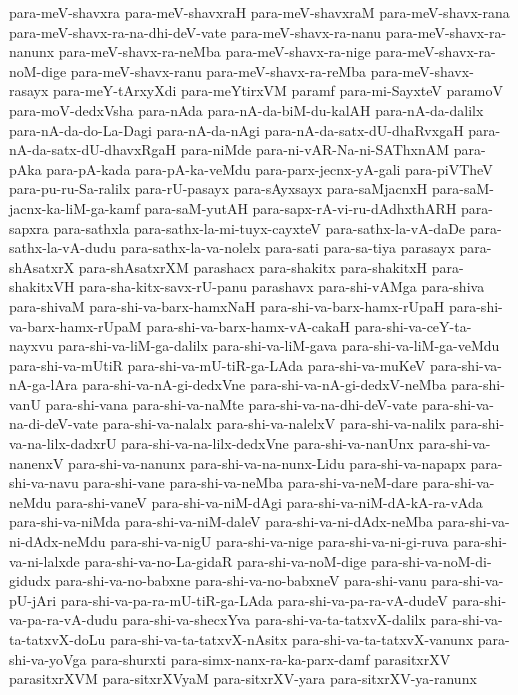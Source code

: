 {para-meV-shavxra
para-meV-shavxraH
para-meV-shavxraM
para-meV-shavx-rana
para-meV-shavx-ra-na-dhi-deV-vate
para-meV-shavx-ra-nanu
para-meV-shavx-ra-nanunx
para-meV-shavx-ra-neMba
para-meV-shavx-ra-nige
para-meV-shavx-ra-noM-dige
para-meV-shavx-ranu
para-meV-shavx-ra-reMba
para-meV-shavx-rasayx
para-meY-tArxyXdi
para-meYtirxVM
paramf
para-mi-SayxteV
paramoV
para-moV-dedxVsha
para-nAda
para-nA-da-biM-du-kalAH
para-nA-da-dalilx
para-nA-da-do-La-Dagi
para-nA-da-nAgi
para-nA-da-satx-dU-dhaRvxgaH
para-nA-da-satx-dU-dhavxRgaH
para-niMde
para-ni-vAR-Na-ni-SAThxnAM
para-pAka
para-pA-kada
para-pA-ka-veMdu
para-parx-jecnx-yA-gali
para-piVTheV
para-pu-ru-Sa-ralilx
para-rU-pasayx
para-sAyxsayx
para-saMjacnxH
para-saM-jacnx-ka-liM-ga-kamf
para-saM-yutAH
para-sapx-rA-vi-ru-dAdhxthARH
para-sapxra
para-sathxla
para-sathx-la-mi-tuyx-cayxteV
para-sathx-la-vA-daDe
para-sathx-la-vA-dudu
para-sathx-la-va-nolelx
para-sati
para-sa-tiya
parasayx
para-shAsatxrX
para-shAsatxrXM
parashacx
para-shakitx
para-shakitxH
para-shakitxVH
para-sha-kitx-savx-rU-panu
parashavx
para-shi-vAMga
para-shiva
para-shivaM
para-shi-va-barx-hamxNaH
para-shi-va-barx-hamx-rUpaH
para-shi-va-barx-hamx-rUpaM
para-shi-va-barx-hamx-vA-cakaH
para-shi-va-ceY-ta-nayxvu
para-shi-va-liM-ga-dalilx
para-shi-va-liM-gava
para-shi-va-liM-ga-veMdu
para-shi-va-mUtiR
para-shi-va-mU-tiR-ga-LAda
para-shi-va-muKeV
para-shi-va-nA-ga-lAra
para-shi-va-nA-gi-dedxVne
para-shi-va-nA-gi-dedxV-neMba
para-shi-vanU
para-shi-vana
para-shi-va-naMte
para-shi-va-na-dhi-deV-vate
para-shi-va-na-di-deV-vate
para-shi-va-nalalx
para-shi-va-nalelxV
para-shi-va-nalilx
para-shi-va-na-lilx-dadxrU
para-shi-va-na-lilx-dedxVne
para-shi-va-nanUnx
para-shi-va-nanenxV
para-shi-va-nanunx
para-shi-va-na-nunx-Lidu
para-shi-va-napapx
para-shi-va-navu
para-shi-vane
para-shi-va-neMba
para-shi-va-neM-dare
para-shi-va-neMdu
para-shi-vaneV
para-shi-va-niM-dAgi
para-shi-va-niM-dA-kA-ra-vAda
para-shi-va-niMda
para-shi-va-niM-daleV
para-shi-va-ni-dAdx-neMba
para-shi-va-ni-dAdx-neMdu
para-shi-va-nigU
para-shi-va-nige
para-shi-va-ni-gi-ruva
para-shi-va-ni-lalxde
para-shi-va-no-La-gidaR
para-shi-va-noM-dige
para-shi-va-noM-di-gidudx
para-shi-va-no-babxne
para-shi-va-no-babxneV
para-shi-vanu
para-shi-va-pU-jAri
para-shi-va-pa-ra-mU-tiR-ga-LAda
para-shi-va-pa-ra-vA-dudeV
para-shi-va-pa-ra-vA-dudu
para-shi-va-shecxYva
para-shi-va-ta-tatxvX-dalilx
para-shi-va-ta-tatxvX-doLu
para-shi-va-ta-tatxvX-nAsitx
para-shi-va-ta-tatxvX-vanunx
para-shi-va-yoVga
para-shurxti
para-simx-nanx-ra-ka-parx-damf
parasitxrXV
parasitxrXVM
para-sitxrXVyaM
para-sitxrXV-yara
para-sitxrXV-ya-ranunx
}
